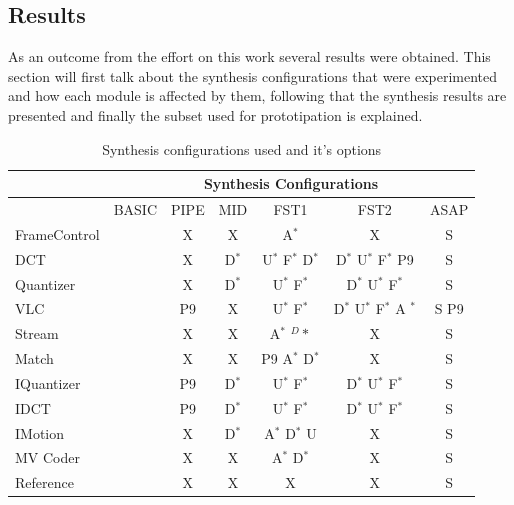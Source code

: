 
\subsection{Results}

As an outcome from the effort on this work several results were obtained. This section will first talk about the synthesis configurations that were experimented and how each module is affected by them, following that the synthesis results are presented and finally the subset used for prototipation is explained.

\begin{table}[h]
\centering
\begin{tabular}{|l||c|c|c|c|c|c|}
\hline
  & \multicolumn{6}{|c|}{Synthesis Configurations} \\ \hline
  		& BASIC & PIPE  & MID   	& FST1  		& FST2  		& ASAP  \\ \hline
FrameControl 	&	& X	& X		& A$^*$  		& X			& S 	\\ \hline
DCT 		&       & X     & D$^*$	 	& U$^*$ F$^*$ D$^*$  	& D$^*$ U$^*$ F$^*$ P9  & S     \\ \hline
Quantizer	&       & X     & D$^*$	 	& U$^*$ F$^*$    	& D$^*$ U$^*$ F$^*$ 	& S     \\ \hline
VLC 		&       & P9    & X     	& U$^*$ F$^*$    	& D$^*$ U$^*$ F$^*$ A   $^*$& S P9   \\ \hline
Stream 		&       & X     & X		& A$^*$ $^D*$		& X			& S     \\ \hline
Match 		&       & X     & X      	& P9 A$^*$ D$^*$	& X			& S     \\ \hline
IQuantizer 	&       & P9    & D$^*$		& U$^*$ F$^*$    	& D$^*$ U$^*$ F$^*$  	& S     \\ \hline
IDCT 		&       & P9    & D$^*$		& U$^*$ F$^*$   	& D$^*$ U$^*$ F$^*$     & S     \\ \hline
IMotion 	&       & X     & D$^*$		& A$^*$ D$^*$ U		& X		        & S     \\ \hline
MV Coder 	&       & X     & X	 	& A$^*$ D$^*$ 		& X			& S     \\ \hline
Reference 	&       & X     & X     	& X      		& X      		& S     \\ \hline

\end{tabular}
\caption{Synthesis configurations used and it's options}
\label{tab:synthconfigs}
\end{table}

